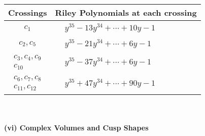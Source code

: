 \documentclass[1p]{elsarticle_modified}
\theoremstyle{definition}
\begin{document}
\begin{tabular}{m{50pt}|m{274pt}}
Crossings & \hspace{64pt}Riley Polynomials at each crossing \\
\hline $$\begin{aligned}c_{1}\end{aligned}$$&$\begin{aligned}
&y^{35}-13 y^{34}+\cdots+10 y-1
\end{aligned}$\\
\hline $$\begin{aligned}c_{2},c_{5}\end{aligned}$$&$\begin{aligned}
&y^{35}-21 y^{34}+\cdots+6 y-1
\end{aligned}$\\
\hline $$\begin{aligned}c_{3},c_{4},c_{9}\\c_{10}\end{aligned}$$&$\begin{aligned}
&y^{35}-37 y^{34}+\cdots+6 y-1
\end{aligned}$\\
\hline $$\begin{aligned}c_{6},c_{7},c_{8}\\c_{11},c_{12}\end{aligned}$$&$\begin{aligned}
&y^{35}+47 y^{34}+\cdots+90 y-1
\end{aligned}$\\
\hline
\end{tabular}\\~\\
\newpage\flushleft \textbf{(vi) Complex Volumes and Cusp Shapes}
\end{document}
